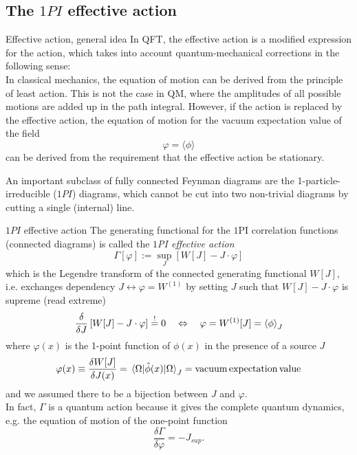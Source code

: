 \subsection{The $1PI$ effective action}
\begin{mybox}{Effective action, general idea}
	In QFT, the effective action is a modified expression for the action, which takes into account quantum-mechanical corrections in the following sense: \\
	In classical mechanics, the equation of motion can be derived from the principle of least action. This is not the case in QM, where the amplitudes of all possible motions are added up in the path integral. However, if the action is replaced by the effective action, the equation of motion for the vacuum expectation value of the field 
	\begin{equation}
		\varphi = \langle \phi \rangle 
	\end{equation}
	can be derived from the requirement that the effective action be stationary.
\end{mybox}
An important subclass of fully connected Feynman diagrams are the 1-particle-irreducible ($1PI$) diagrams, which cannot be cut into two non-trivial diagrams by cutting a single (internal) line.\\
\begin{mybox}{$1PI$ effective action}
The generating functional for the $1$PI correlation functions (connected diagrams) is called the \emph{$1$PI effective action}
\begin{equation}
\label{eq:onePIeffectiveaction}
\Gamma[\varphi] := \sup_J \left[W[J]-J\cdot \varphi \right]
\end{equation}
which is the Legendre transform of the connected generating functional $W[J]$, i.e. exchanges dependency $J\leftrightarrow\varphi=W^{(1)}$ by setting $J$ such that $W[J]-J\cdot \varphi$ is supreme (read extreme)
\begin{equation}
	\frac{\delta}{\delta J} \left[W[J]-J\cdot \varphi \right] \stackrel{!}{=} 0 \quad \Leftrightarrow \quad \varphi = W^{(1)} [J] = \expval{\phi}_J
\end{equation}
	where $\varphi(x)$ is the 1-point function of $\phi(x)$ in the presence of a source $J$ 
	\begin{equation}
		\varphi(x) \equiv \frac{\delta W[J]}{\delta J(x)} = \expval{\hat{\phi}(x)}{\Omega}_J = \mathrm{vacuum\,expectation\,value}
	\end{equation}
	and we assumed there to be a bijection between $J$ and $\varphi$.\\
	In fact, $\Gamma$ is a quantum action because it gives the complete quantum dynamics, e.g. the equation of motion of the one-point function
	\begin{equation}
	\label{eq:quantumeom}
		\frac{\delta \Gamma}{\delta \varphi} = -J_{sup}.
	\end{equation}
	\end{mybox}
